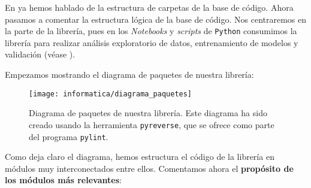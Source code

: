 En  ya hemos hablado de la estructura de carpetas de la base de código. Ahora pasamos a comentar la estructura lógica de la base de código. Nos centraremos en la parte de la librería, pues en los \textit{Notebooks} y \textit{scripts} de \lstinline{Python} consumimos la librería para realizar análisis exploratorio de datos, entrenamiento de modelos y validación (véase ).

Empezamos mostrando el diagrama de paquetes de nuestra librería:

\begin{figure}[H]
    \centering
    \texttt{[image: informatica/diagrama\_paquetes]}
    \caption{Diagrama de paquetes de nuestra librería. Este diagrama ha sido creado usando la herramienta \lstinline{pyreverse}, que se ofrece como parte del programa \lstinline{pylint}.}
\end{figure}

Como deja claro el diagrama, hemos estructura el código de la librería en módulos muy interconectados entre ellos. Comentamos ahora el \textbf{propósito de los módulos más relevantes}:

